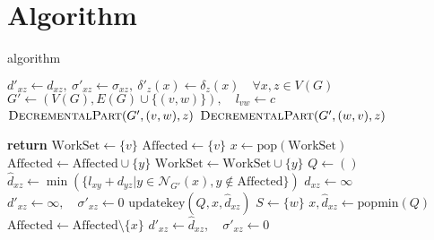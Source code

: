 
\onecolumn
\section{Algorithm}
\begin{algorithm}[H]
  \caption{algorithm}
  \label{algo:decremental-algorithm}
  \begin{algorithmic}[1]\small
    \State $d'_{xz}\gets d_{xz},\:\sigma'_{xz}\gets \sigma_{xz},\:\delta'_z(x)\gets \delta_z(x)\quad\forall x,z\in V(G)$
    \State $G'\gets(V(G),E(G)\cup\{(v,w)\}),\quad l_{vw}\gets c$
    \State $\textsc{DecrementalPart}(G',(v,w),z)$
    \Else
    \State $\textsc{DecrementalPart}(G',(w,v),z)$
    \EndIf
    \EndFor
    \EndProcedure
  \end{algorithmic}
  \begin{multicols}{2}
    \begin{algorithmic}[1]\small
      \makeatletter
      \setcounter{ALG@line}{11}
      \makeatother
      \State \textbf{return}
      \EndIf
      \State $\mathrm{WorkSet}\gets\{v\}$
      \State $\mathrm{Affected}\gets\{v\}$
      \State
      \State $x\gets\mathrm{pop}(\mathrm{WorkSet})$
      \State $\mathrm{Affected}\gets\mathrm{Affected}\cup\{y\}$
      \State $\mathrm{WorkSet}\gets\mathrm{WorkSet}\cup\{y\}$
      \EndIf
      \EndFor
      \EndWhile
      \State
      \State $Q\gets()$ %
      \State $\hat{d}_{xz}\gets\min(\{l_{xy}+d_{yz}\vert y\in\mathcal{N}_{G'}(x),y\notin\mathrm{Affected}\})$
      \Else
      \State $\hat{d}_{xz}\gets\infty$
      \EndIf
      \State $d'_{xz}\gets\infty,\quad\sigma'_{xz}\gets 0$
      \Else
      \State $\mathrm{updatekey}(Q, x, \hat{d}_{xz})$
      \EndIf
      \EndFor
      \State
      \State $S\gets\{w\}$ %
      \State $x,\hat{d}_{xz}\gets\mathrm{popmin}(Q)$
      \State $\mathrm{Affected}\gets\mathrm{Affected}\setminus\{x\}$
      \State $d'_{xz}\gets\hat{d}_{xz},\quad\sigma'_{xz}\gets 0$

\end{algorithmic}
\end{multicols}
\end{algorithm}

